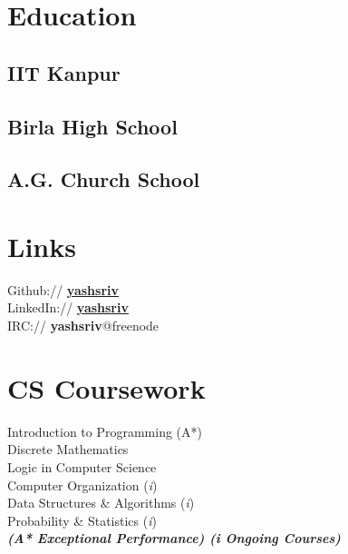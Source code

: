 \documentclass[]{deedy-resume-openfont}
\begin{document}
\begin{minipage}[t]{0.33\textwidth} 


\section{Education} 

\subsection{IIT Kanpur}
\sectionsep{}

\subsection{Birla High School}
\sectionsep{}

\subsection{A.G. Church School}


\section{Links} 
Github:// \href{https://github.com/yashsriv}{\bf yashsriv} \\
LinkedIn://  \href{https://www.linkedin.com/in/yashsriv}{\bf yashsriv} \\
IRC:// \textbf{yashsriv}@freenode


\section{CS Coursework}
Introduction to Programming (A*) \\
Discrete Mathematics \\
Logic in Computer Science \\
Computer Organization (\textit{i}) \\
Data Structures \& Algorithms (\textit{i}) \\
Probability \& Statistics (\textit{i}) \\
{\footnotesize \textit{\textbf{(A* Exceptional Performance) \enspace{} (\textit{i} Ongoing Courses)}}}


\end{minipage}
\end{document}
